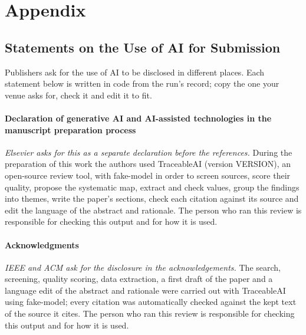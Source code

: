 \documentclass[10pt,a4paper]{article}
\begin{document}
\clearpage
\section*{Appendix}\label{sec:appendix}
\setcounter{table}{0}
\renewcommand{\thetable}{A.\arabic{table}}
\renewcommand{\theHtable}{A.\arabic{table}} %

\subsection*{Statements on the Use of AI for Submission}
Publishers ask for the use of AI to be disclosed in different places. Each statement below is written in code from the run's record; copy the one your venue asks for, check it and edit it to fit.
\paragraph{Declaration of generative AI and AI-assisted technologies in the manuscript preparation process}
\textit{Elsevier asks for this as a separate declaration before the references.} During the preparation of this work the authors used TraceableAI (version VERSION), an open-source review tool, with fake-model in order to screen sources, score their quality, propose the systematic map, extract and check values, group the findings into themes, write the paper's sections, check each citation against its source and edit the language of the abstract and rationale. The person who ran this review is responsible for checking this output and for how it is used.\par
\paragraph{Acknowledgments}
\textit{IEEE and ACM ask for the disclosure in the acknowledgements.} The search, screening, quality scoring, data extraction, a first draft of the paper and a language edit of the abstract and rationale were carried out with TraceableAI using fake-model; every citation was automatically checked against the kept text of the source it cites. The person who ran this review is responsible for checking this output and for how it is used.\par
\end{document}

